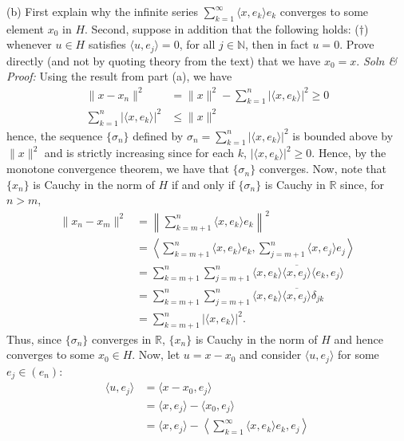 \documentclass{article}
\begin{document}
\begin{itemize}
    
    (b) First explain why the infinite series $\sum_{k = 1}^{\infty} \langle x, e_k\rangle e_k$ converges to some element $x_0$ in $H$. Second, suppose in addition that the following holds: ($\dag$) whenever $u \in H$ satisfies $\langle u, e_j\rangle = 0$, for all $j \in \mathbb{N}$, then in fact $u = 0$. Prove directly (and not by quoting theory from the text) that we have $x_0 = x$.
    \newline\newline
    \textit{Soln \& Proof:} Using the result from part (a), we have
    \begin{align*}
        \|x - x_n\|^2 &= \|x\|^2 - \sum_{k = 1}^n |\langle x, e_k \rangle |^2 \geq 0\\
        \sum_{k = 1}^n |\langle x, e_k\rangle|^2 &\leq \|x\|^2
    \end{align*}
    hence, the sequence $\{\sigma_n\}$ defined by $\sigma_n = \sum_{k = 1}^n |\langle x, e_k\rangle |^2$ is bounded above by $\|x\|^2$ and is strictly increasing since for each $k$, $|\langle x, e_k \rangle|^2 \geq 0$. Hence, by the monotone convergence theorem, we have that $\{\sigma_n\}$ converges. Now, note that $\{x_n\}$ is Cauchy in the norm of $H$ if and only if $\{\sigma_n\}$ is Cauchy in $\mathbb{R}$ since, for $n > m$,
    \begin{align*}
        \|x_n - x_m\|^2 &= \left\| \sum_{k = m+1}^n \langle x, e_k \rangle e_k \right\|^2\\
        &= \left\langle \sum_{k = m+1}^n \langle x, e_k \rangle e_k, \sum_{j = m+1}^n \langle x, e_j \rangle e_j \right\rangle \\
        &= \sum_{k = m+1}^n\sum_{j = m+1}^n \langle x, e_k\rangle \overline{\langle x, e_j \rangle} \langle e_k, e_j \rangle\\
        &= \sum_{k = m+1}^n \sum_{j = m+1}^n \langle x, e_k\rangle \overline{\langle x, e_j \rangle} \delta_{jk}\\
        &= \sum_{k = m+1}^n |\langle x, e_k\rangle|^2.
    \end{align*}
    Thus, since $\{\sigma_n\}$ converges in $\mathbb{R}$, $\{x_n\}$ is Cauchy in the norm of $H$ and hence converges to some $x_0 \in H$. Now, let $u = x - x_0$ and consider $\langle u, e_j\rangle$ for some $e_j \in (e_n)$:
    \begin{align*}
        \langle u, e_j \rangle &= \langle x - x_0, e_j\rangle\\
        &= \langle x, e_j\rangle - \langle x_0, e_j \rangle\\
        &= \langle x, e_j\rangle - \left\langle \sum_{k = 1}^{\infty}\langle x, e_k \rangle e_k, e_j\right\rangle\\

\end{align*}
\end{itemize}
\end{document}
